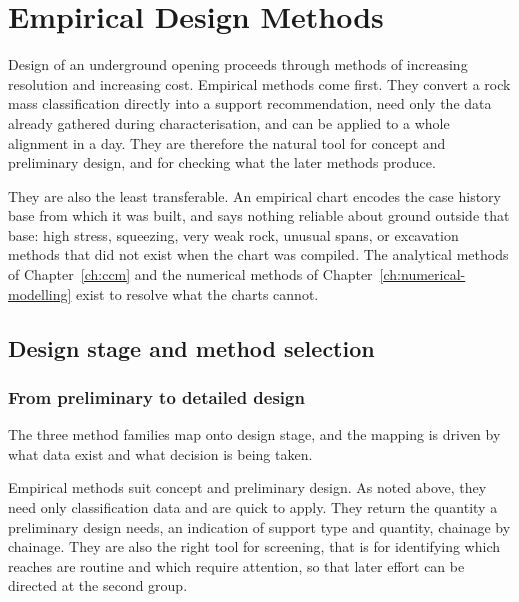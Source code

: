\chapter{Empirical Design Methods}
\label{ch:empirical-design}

Design of an underground opening proceeds through methods of increasing
resolution and increasing cost. Empirical methods come first. They convert a
rock mass classification directly into a support recommendation, need only the
data already gathered during characterisation, and can be applied to a whole
alignment in a day. They are therefore the natural tool for concept and
preliminary design, and for checking what
the later methods produce.

They are also the least transferable. An empirical chart encodes the case
history base from which it was built, and says nothing reliable about ground
outside that base: high stress, squeezing, very weak rock, unusual spans, or
excavation methods that did not exist when the chart was compiled. The
analytical methods of Chapter~\ref{ch:ccm} and the numerical methods of
Chapter~\ref{ch:numerical-modelling} exist to resolve what the charts cannot.

\section{Design stage and method selection}
\label{sec:design-stage}

\subsection{From preliminary to detailed design}
\label{sec:preliminary-to-detailed}

The three method families map onto design stage, and the mapping is driven by
what data exist and what decision is being taken.

Empirical methods suit concept and preliminary design. As noted above, they
need only classification data and are quick to apply. They return the quantity a preliminary
design needs, an indication of support type and quantity, chainage
by chainage. They are also the right tool for screening, that is for identifying which
reaches are routine and which require attention, so that later effort can be
directed at the second group.

